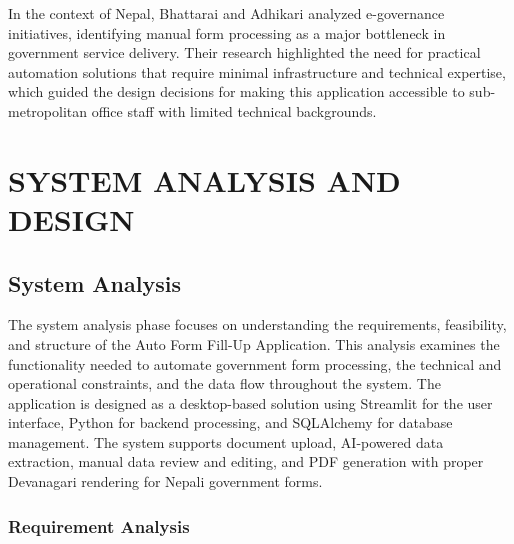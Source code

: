 \documentclass[12pt]{report}
\begin{document}
In the context of Nepal, Bhattarai and Adhikari \cite{bhattarai2019} analyzed e-governance initiatives, identifying manual form processing as a major bottleneck in government service delivery. Their research highlighted the need for practical automation solutions that require minimal infrastructure and technical expertise, which guided the design decisions for making this application accessible to sub-metropolitan office staff with limited technical backgrounds.
\newpage
\chapter{SYSTEM ANALYSIS AND DESIGN}
\section{System Analysis}
The system analysis phase focuses on understanding the requirements, feasibility, and structure of the Auto Form Fill-Up Application. This analysis examines the functionality needed to automate government form processing, the technical and operational constraints, and the data flow throughout the system. The application is designed as a desktop-based solution using Streamlit for the user interface, Python for backend processing, and SQLAlchemy for database management. The system supports document upload, AI-powered data extraction, manual data review and editing, and PDF generation with proper Devanagari rendering for Nepali government forms.

\subsection{Requirement Analysis}
\end{document}
